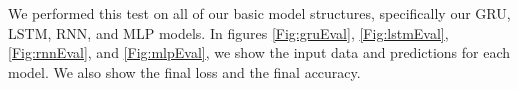 \documentclass{ledger}
\begin{document}
We performed this test on all of our basic model structures, specifically our GRU, LSTM, RNN, and MLP models. In figures \ref{Fig:gruEval}, \ref{Fig:lstmEval}, \ref{Fig:rnnEval}, and \ref{Fig:mlpEval}, we show the input data and predictions for each model. We also show the final loss and the final accuracy.


\end{document}
